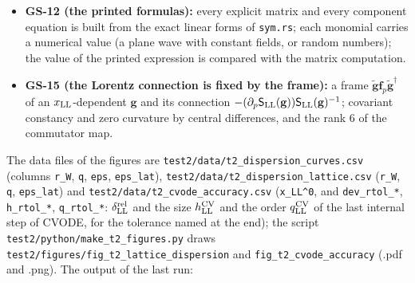 \documentclass[
  10pt,
]{article}
\begin{document}
\begin{itemize}
  and check GS-20 reproduces the last settled grid point and the time
  defect of the notebook from them by its own additions. The Python
  script \texttt{test2/python/t2\_formula\_check.py} computes the
  formulas of GS-18 and GS-20 once more with 40 digits (library mpmath)
  and by other routes (checks FC-1 to FC-6: the coefficients from their
  series; every number of \texttt{t2\_steps\_formulas.csv}; the factor
  of a step read off after 400 steps of the recurrences themselves; the
  leading errors; the roots, for CVODE as the eigenvalues of the matrix
  that advances the stored amplitudes and derivatives by one step; the
  limits of stability);
  \texttt{test2/python/make\_t2\_steps\_figures.py} draws the five
  figures \texttt{test2/figures/fig\_t2\_steps\_modes},
  \texttt{fig\_t2\_steps\_stability}, \texttt{fig\_t2\_steps\_wave},
  \texttt{fig\_t2\_steps\_scan} and
  \texttt{fig\_t2\_steps\_last\_digits} (.pdf and .png).
\item
  \textbf{GS-12 (the printed formulas):} every explicit matrix and every
  component equation is built from the exact linear forms of
  \texttt{sym.rs}; each monomial carries a numerical value (a plane wave
  with constant fields, or random numbers); the value of the printed
  expression is compared with the matrix computation.
\item
  \textbf{GS-15 (the Lorentz connection is fixed by the frame):} a frame
  \(\tilde{\mathbf g}\mathbf f_p\tilde{\mathbf g}^\dagger\) of an
  \(x_{\rm LL}\)-dependent \(\mathbf g\) and its connection
  \(-(\partial_p\mathsf S_{\rm LL}(\mathbf g))\mathsf S_{\rm LL}(\mathbf g)^{-1}\);
  covariant constancy and zero curvature by central differences, and the
  rank 6 of the commutator map.
\end{itemize}

The data files of the figures are
\texttt{test2/data/t2\_dispersion\_curves.csv} (columns \texttt{r\_W},
\texttt{q}, \texttt{eps}, \texttt{eps\_lat}),
\texttt{test2/data/t2\_dispersion\_lattice.csv} (\texttt{r\_W},
\texttt{q}, \texttt{eps\_lat}) and
\texttt{test2/data/t2\_cvode\_accuracy.csv} (\texttt{x\_LL\^{}0}, and
\texttt{dev\_rtol\_*}, \texttt{h\_rtol\_*}, \texttt{q\_rtol\_*}:
\(\delta^{\rm rel}_{\rm LL}\) and the size \(h^{\rm CV}_{\rm LL}\) and
the order \(q^{\rm CV}_{\rm LL}\) of the last internal step of CVODE,
for the tolerance named at the end); the script
\texttt{test2/python/make\_t2\_figures.py} draws
\texttt{test2/figures/fig\_t2\_lattice\_dispersion} and
\texttt{fig\_t2\_cvode\_accuracy} (.pdf and .png). The output of the
last run:
\end{document}

